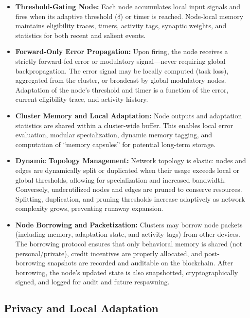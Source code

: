 \documentclass[11pt]{article}
\begin{document}
\begin{itemize}
    \item \textbf{Threshold-Gating Node:} Each node accumulates local input signals and fires when its adaptive threshold (\(\delta\)) or timer is reached. Node-local memory maintains eligibility traces, timers, activity tags, synaptic weights, and statistics for both recent and salient events.

    \item \textbf{Forward-Only Error Propagation:} Upon firing, the node receives a strictly forward-fed error or modulatory signal—never requiring global backpropagation. The error signal may be locally computed (task loss), aggregated from the cluster, or broadcast by global modulatory nodes. Adaptation of the node’s threshold and timer is a function of the error, current eligibility trace, and activity history.

    \item \textbf{Cluster Memory and Local Adaptation:} Node outputs and adaptation statistics are shared within a cluster-wide buffer. This enables local error evaluation, modular specialization, dynamic memory tagging, and computation of “memory capsules” for potential long-term storage.

    \item \textbf{Dynamic Topology Management:} Network topology is elastic: nodes and edges are dynamically split or duplicated when their usage exceeds local or global thresholds, allowing for specialization and increased bandwidth. Conversely, underutilized nodes and edges are pruned to conserve resources. Splitting, duplication, and pruning thresholds increase adaptively as network complexity grows, preventing runaway expansion.

    \item \textbf{Node Borrowing and Packetization:} Clusters may borrow node packets (including memory, adaptation state, and activity tags) from other devices. The borrowing protocol ensures that only behavioral memory is shared (not personal/private), credit incentives are properly allocated, and post-borrowing snapshots are recorded and auditable on the blockchain. After borrowing, the node’s updated state is also snapshotted, cryptographically signed, and logged for audit and future respawning.
\end{itemize}

\subsection{Privacy and Local Adaptation}
\end{document}
